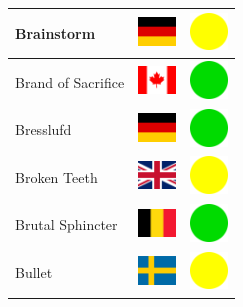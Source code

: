 \documentclass[12pt, a4paper, twoside]{report}
\begin{document}
\begin{center}
\begin{longtable}{|p{5cm}|p{2cm}|p{2cm}|}
 Brainstorm                                                 & \includegraphics[width=1cm]{../4x3/de} &   \includegraphics[width=1cm]{../likes/m} \\ \hline
 Brand of Sacrifice                                         & \includegraphics[width=1cm]{../4x3/ca} &   \includegraphics[width=1cm]{../likes/y} \\ \hline
 Bresslufd                                                  & \includegraphics[width=1cm]{../4x3/de} &   \includegraphics[width=1cm]{../likes/y} \\ \hline
 Broken Teeth                                               & \includegraphics[width=1cm]{../4x3/gb} &   \includegraphics[width=1cm]{../likes/m} \\ \hline
 Brutal Sphincter                                           & \includegraphics[width=1cm]{../4x3/be} &   \includegraphics[width=1cm]{../likes/y} \\ \hline
 Bullet                                                     & \includegraphics[width=1cm]{../4x3/se} &   \includegraphics[width=1cm]{../likes/m} \\ \hline

\end{longtable}
\end{center}
\end{document}
